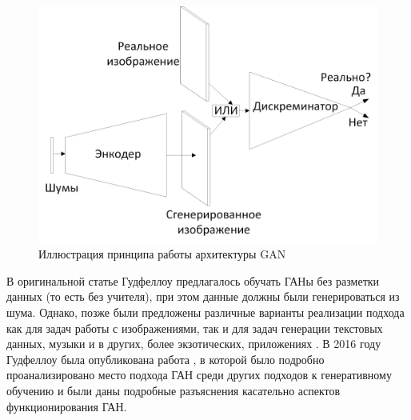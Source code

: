 \documentclass[12pt]{article}
\begin{document}
\begin{sloppypar}
    \begin{figure}[!h]
    	\begin{center}
    		\includegraphics[width=0.99\linewidth]{./figuresch1/GAN.png}
    		\caption{Иллюстрация  принципа работы  архитектуры GAN}	
    		\label{ch1:fig:GAN}
    	\end{center}
    \end{figure}

В оригинальной статье Гудфеллоу предлагалось обучать ГАНы без разметки данных (то есть без учителя), при этом данные должны были генерироваться из шума. Однако, позже были предложены различные варианты реализации подхода как для задач работы с изображениями, так и для задач генерации текстовых данных, музыки \cite{gui2020review} и в других, более экзотических, приложениях \cite{manaswi2020generative, jabbar2020survey}. В 2016 году Гудфеллоу была опубликована работа \cite{goodfellow2016nips}, в которой было подробно проанализировано место подхода ГАН среди других подходов к генеративному обучению и были даны подробные разъяснения касательно аспектов функционирования ГАН.


\end{sloppypar}
\end{document}
